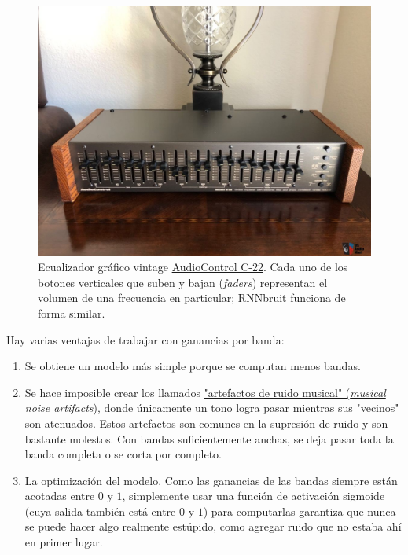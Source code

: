\documentclass[conference,onecolumn]{IEEEtran}
\begin{document}
 \begin{figure}[H]
 \centering
    \includegraphics[scale=0.2]{22bEq.jpg}
    \caption{Ecualizador gráfico vintage \href{https://www.canuckaudiomart.com/details/649586296-vintage-audio-control-c-22-octave-10-band-equalizer/images/2554905/}{AudioControl C-22}. Cada uno de los botones verticales que suben y bajan (\textit{faders}) representan el volumen de una frecuencia en particular; RNNbruit funciona de forma similar.} 
\end{figure}

Hay varias ventajas de trabajar con ganancias por banda:
\begin{enumerate}
    \item Se obtiene un modelo más simple porque se computan menos bandas.
    \item Se hace imposible crear los llamados \href{https://www.vocal.com/noise-reduction/musical-noise/}{"artefactos de ruido musical" (\textit{musical noise artifacts})}, donde únicamente un tono logra pasar mientras sus "vecinos" son atenuados. Estos artefactos son comunes en la supresión de ruido y son bastante molestos. Con bandas suficientemente anchas, se deja pasar toda la banda completa o se corta por completo.
    \item La optimización del modelo. Como las ganancias de las bandas siempre están acotadas entre $0$ y $1$, simplemente usar una función de activación sigmoide (cuya salida también está entre $0$ y $1$) para computarlas garantiza que nunca se puede hacer algo realmente estúpido, como agregar ruido que no estaba ahí en primer lugar.
\end{enumerate}
\end{document}

